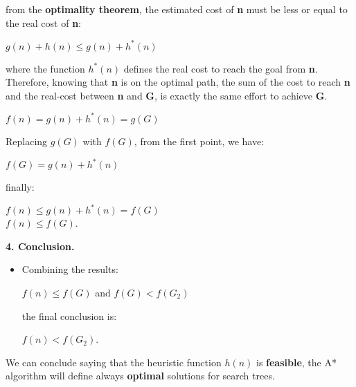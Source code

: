 \begin{example}
\begin{itemize}
        from the \textbf{optimality theorem}, the estimated cost of \textbf{n} must be less or equal to the real cost of \textbf{n}: \vspace{3.5pt}
        \begin{center}
            $g(n) + h(n) \le g(n) + h^*(n)$
        \end{center} \vspace{3.5pt}

        where the function $h^*(n)$ defines the real cost to reach the goal from \textbf{n}. Therefore, knowing that \textbf{n} is on the optimal path, the sum of the cost 
        to reach \textbf{n} and the real-cost between \textbf{n} and \textbf{G}, is exactly the same effort to achieve \textbf{G}. \vspace{3.5pt}
        \begin{center}
            $f(n) = g(n) + h^*(n) = g(G)$
        \end{center} \vspace{3.5pt}

        Replacing $g(G)$ with $f(G)$, from the first point, we have: \vspace{3.5pt}
        \begin{center}
            $f(G) = g(n) + h^*(n)$
        \end{center} \vspace{3.5pt}

        finally: \vspace{3.5pt}
        \begin{center}
            $f(n) \le g(n) + h^*(n) = f(G)$ \\
            $f(n) \le f(G)$.
        \end{center} \vspace{3.5pt}
    \end{itemize}

    \textbf{4. Conclusion.} 
    \begin{itemize}
        \renewcommand{\labelitemi}{}
        \item \vspace{3.5pt}
        Combining the results:\vspace{3.5pt}
        \begin{center}
            $f(n) \le f(G)$ and $f(G) < f(G_2)$
        \end{center} \vspace{3.5pt}

        the final conclusion is:\vspace{3.5pt}
        \begin{center}
            $f(n) < f(G_2)$.
        \end{center} 
    \end{itemize} \vspace{7pt}

    We can conclude saying that the heuristic function $h(n)$ is \textbf{feasible}, the A* algorithm will define always \textbf{optimal} solutions for search trees.  
\end{example} \vspace{7pt}

